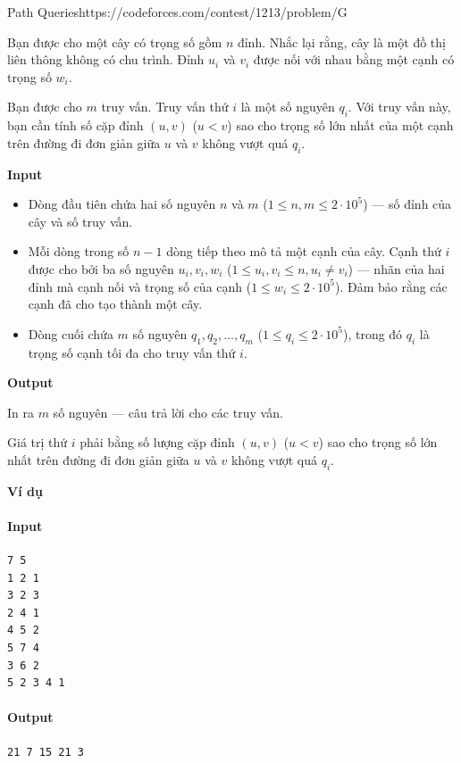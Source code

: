 \begin{baitap}{Path Queries}{https://codeforces.com/contest/1213/problem/G}

Bạn được cho một cây có trọng số gồm $n$ đỉnh. Nhắc lại rằng, cây là một đồ thị liên thông không có chu trình. Đỉnh $u_i$ và $v_i$ được nối với nhau bằng một cạnh có trọng số $w_i$.

Bạn được cho $m$ truy vấn. Truy vấn thứ $i$ là một số nguyên $q_i$. Với truy vấn này, bạn cần tính số cặp đỉnh $(u,v)$ ($u < v$) sao cho trọng số lớn nhất của một cạnh trên đường đi đơn giản giữa $u$ và $v$ không vượt quá $q_i$.

\textbf{Input}

\begin{itemize}
    \item Dòng đầu tiên chứa hai số nguyên $n$ và $m$ ($1 \le n,m \le 2 \cdot 10^5$) — số đỉnh của cây và số truy vấn.
    \item Mỗi dòng trong số $n-1$ dòng tiếp theo mô tả một cạnh của cây. 
    Cạnh thứ $i$ được cho bởi ba số nguyên $u_i, v_i, w_i$ ($1 \le u_i,v_i \le n, u_i \ne v_i$) — nhãn của hai đỉnh mà cạnh nối và trọng số của cạnh ($1 \le w_i \le 2 \cdot 10^5$). 
    Đảm bảo rằng các cạnh đã cho tạo thành một cây.
    \item Dòng cuối chứa $m$ số nguyên $q_1, q_2, \dots, q_m$ ($1 \le q_i \le 2 \cdot 10^5$), trong đó $q_i$ là trọng số cạnh tối đa cho truy vấn thứ $i$.
\end{itemize}

\textbf{Output}

In ra $m$ số nguyên — câu trả lời cho các truy vấn.  

Giá trị thứ $i$ phải bằng số lượng cặp đỉnh $(u,v)$ ($u < v$) sao cho trọng số lớn nhất trên đường đi đơn giản giữa $u$ và $v$ không vượt quá $q_i$.

\textbf{Ví dụ}

\paragraph{Input}
\begin{lstlisting}
7 5
1 2 1
3 2 3
2 4 1
4 5 2
5 7 4
3 6 2
5 2 3 4 1
\end{lstlisting}
\paragraph{Output}
\begin{lstlisting}
21 7 15 21 3 
\end{lstlisting}


\end{baitap}
